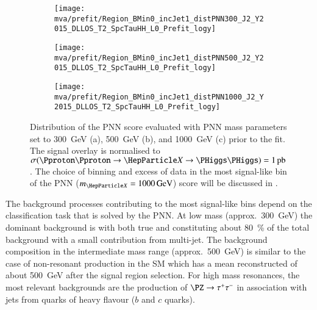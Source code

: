 \begin{figure}[htbp]
  \centering

  \begin{subfigure}[t]{.49\textwidth}
    \texttt{[image: mva/prefit/Region\_BMin0\_incJet1\_distPNN300\_J2\_Y2015\_DLLOS\_T2\_SpcTauHH\_L0\_Prefit\_logy]}
    \caption{}
    \label{fig:pnn_score_prefit_300}
  \end{subfigure}\hfill%
  \begin{subfigure}[t]{.49\textwidth}
    \centering
    \texttt{[image: mva/prefit/Region\_BMin0\_incJet1\_distPNN500\_J2\_Y2015\_DLLOS\_T2\_SpcTauHH\_L0\_Prefit\_logy]}
    \caption{}
    \label{fig:pnn_score_prefit_500}
  \end{subfigure}

  \begin{subfigure}[t]{.49\textwidth}
    \centering
    \texttt{[image: mva/prefit/Region\_BMin0\_incJet1\_distPNN1000\_J2\_Y2015\_DLLOS\_T2\_SpcTauHH\_L0\_Prefit\_logy]}
    \caption{}
    \label{fig:pnn_score_prefit_1000}
  \end{subfigure}

  \caption{Distribution of the PNN score evaluated with PNN mass
    parameters set to \SI{300}{\GeV} (a), \SI{500}{\GeV} (b), and
    \SI{1000}{\GeV} (c) prior to the fit.  The signal overlay is
    normalised to
    $\sigma(\Pproton\Pproton \to \PX \to \HH) =
    \SI{1}{\pico\barn}$. The choice of binning and excess of data in
    the most signal-like bin of the PNN ($\mX = \SI{1000}{\GeV}$)
    score will be discussed in .}%
  \label{fig:pnn_score_prefit}
\end{figure}

The background processes contributing to the most signal-like bins
depend on the classification task that is solved by the PNN. At low
mass (approx.\ \SI{300}{\GeV}) the dominant background is \ttbar with
both true and \faketauhadvis constituting about \SI{80}{\percent} of
the total background with a small contribution from multi-jet.  The
background composition in the intermediate mass range (approx.\
\SI{500}{\GeV}) is similar to the case of non-resonant \HH production
in the SM which has a mean reconstructed \mHH of about \SI{500}{\GeV}
after the signal region selection. For high mass resonances, the most
relevant backgrounds are the production of $\PZ \to \tautau$ in
association with jets from quarks of heavy flavour ($b$ and $c$
quarks).

